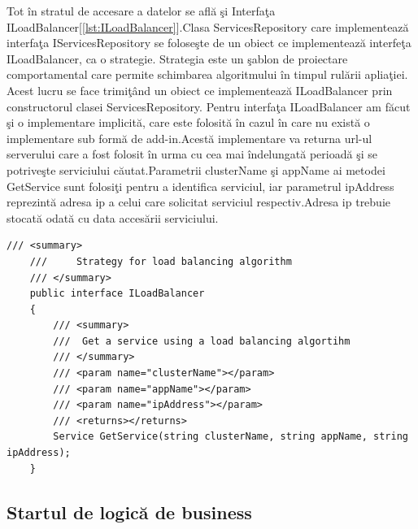 \documentclass[a4paper,12pt]{report}
\let\oldref\ref
\renewcommand{\ref}[1]{[\oldref{#1}]}
\begin{document}
Tot \^in stratul de accesare a datelor se afl\u a \c si Interfa\c ta ILoadBalancer\ref{lst:ILoadBalancer}.Clasa ServicesRepository care implementeaz\u a
interfa\c ta IServicesRepository se folose\c ste de un obiect ce implementeaz\u a interfe\c ta ILoadBalancer, ca o strategie.
Strategia este un \c sablon de proiectare comportamental care permite schimbarea algoritmului \^in timpul rul\u arii aplia\c tiei.
Acest lucru se face trimi\c t\^and un obiect ce implementeaz\u a ILoadBalancer prin constructorul clasei ServicesRepository.
Pentru interfa\c ta ILoadBalancer am f\u acut \c si o implementare implicit\u a, care este folosit\u a \^in cazul \^in care nu exist\u a o implementare sub form\u a de 
add-in.Acest\u a implementare va returna url-ul serverului care a fost folosit \^in urma cu cea mai \^indelungat\u a perioad\u a \c si se potrive\c ste 
serviciului c\u autat.Parametrii clusterName \c si appName ai metodei GetService sunt folosi\c ti pentru a identifica serviciul,
iar  parametrul ipAddress reprezint\u a adresa ip a celui care solicitat serviciul respectiv.Adresa ip trebuie stocat\u a odat\u a
cu data acces\u arii serviciului.

\begin{lstlisting}[caption={Interfa\c ta ILoadBalancer},label={lst:ILoadBalancer}, breaklines]	
    /// <summary>
    ///     Strategy for load balancing algorithm
    /// </summary>
    public interface ILoadBalancer
    {
        /// <summary>
        ///  Get a service using a load balancing algortihm
        /// </summary>
        /// <param name="clusterName"></param>
        /// <param name="appName"></param>
        /// <param name="ipAddress"></param>
        /// <returns></returns>
        Service GetService(string clusterName, string appName, string ipAddress);
    }
\end{lstlisting}

\pagebreak

\subsection{Startul de logic\u a de business}
\end{document}
